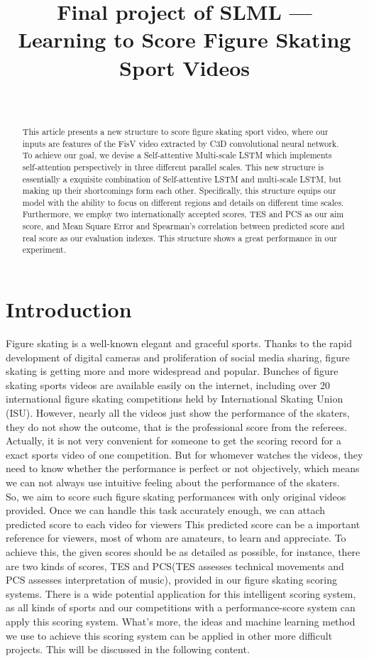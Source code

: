 \documentclass{article}
\title{Final project of SLML --- \\Learning to Score Figure Skating Sport Videos}
\author{%
\
}
\begin{document}

\maketitle

\begin{abstract}
This article presents a new structure to score figure skating sport video, where our inputs are features of the FisV video extracted by C3D convolutional neural network. To achieve our goal, we devise a Self-attentive Multi-scale LSTM which implements self-attention perspectively in three different parallel scales. This new structure is essentially a exquisite combination of Self-attentive LSTM and multi-scale LSTM, but making up their shortcomings form each other. Specifically, this structure equips our model with the ability to focus on different regions and details on different time scales. Furthermore, we employ two internationally accepted scores, TES and PCS as our aim score, and Mean Square Error and Spearman's correlation between predicted score and real score as our evaluation indexes. This structure shows a great performance in our experiment.
\end{abstract}

\section{Introduction}
Figure skating is a well-known elegant and graceful sports. Thanks to the rapid development of digital cameras and proliferation of social media sharing, figure skating is getting more and more widespread and popular. Bunches of figure skating sports videos are available easily on the internet, including over 20 international figure skating competitions held by International Skating Union (ISU).  However, nearly all the videos just show the performance of the skaters, they do not show the outcome, that is the professional score from the referees. Actually, it is not very convenient for someone to get the scoring record for a exact sports video of one competition. But for whomever watches the videos, they need to know whether the performance is perfect or not objectively, which means we can not always use intuitive feeling about the performance of the skaters.\\ 
So, we aim to score such figure skating performances with only original videos provided. Once we can handle this task accurately enough, we can attach predicted score to each video for viewers This predicted score can be a important reference for viewers, most of whom are amateurs, to learn and appreciate. To achieve this, the given scores should be as detailed as possible, for instance, there are two kinds of scores, TES and PCS(TES assesses technical movements and PCS assesses interpretation of music), provided in our figure skating scoring systems. There is a wide potential application for this intelligent scoring system, as all kinds of sports and our competitions with a performance-score system can apply this scoring system. What's more, the ideas and machine learning method we use to achieve this scoring system can be applied in other more difficult projects. This will be discussed in the following content.
\end{document}
